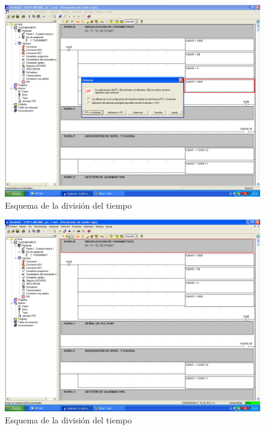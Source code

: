 \begin{figure}[ht!]
	\centering
	\includegraphics[scale=0.3]{Anexos/images/twidosoftcargar.PNG}
	\caption{Esquema de la división del tiempo}
	\label{img:twidosoftcargar}
\end{figure}

\begin{figure}[ht!]
	\centering
	\includegraphics[scale=0.3]{Anexos/images/twidosoftrun.PNG}
	\caption{Esquema de la división del tiempo}
	\label{img:twidosoftrun}
\end{figure}

